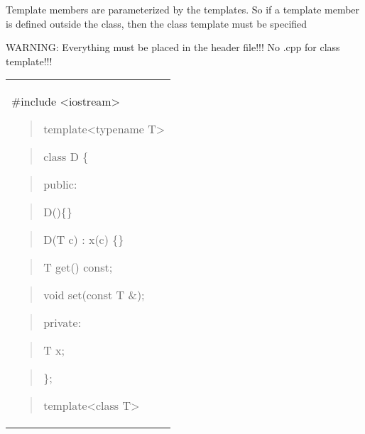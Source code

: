 \documentclass[
]{article}
\begin{document}
Template members are parameterized by the templates. So if a template
member is defined outside the class, then the class template must be
specified

WARNING: Everything must be placed in the header file!!! No .cpp for
class template!!!

\begin{longtable}[]{@{}
  >{\raggedright\arraybackslash}p{}@{}}
\toprule\noalign{}
 \\
\midrule\noalign{}
\endhead
\bottomrule\noalign{}
\endlastfoot
\#include \textless iostream\textgreater{}

\begin{quote}
\end{quote}

\begin{quote}
template\textless typename T\textgreater{}
\end{quote}

\begin{quote}
class D \{
\end{quote}

\begin{quote}
public:
\end{quote}

\begin{quote}
D()\{\}
\end{quote}

\begin{quote}
D(T c) : x(c) \{\}
\end{quote}

\begin{quote}
T get() const;
\end{quote}

\begin{quote}
void set(const T \&);
\end{quote}

\begin{quote}
private:
\end{quote}

\begin{quote}
T x;
\end{quote}

\begin{quote}
\};
\end{quote}

\begin{quote}
\end{quote}

\begin{quote}
template\textless class T\textgreater{}
\end{quote}


\end{longtable}
\end{document}
